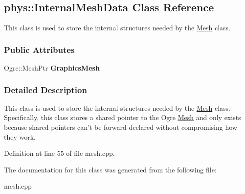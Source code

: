 \hypertarget{classphys_1_1InternalMeshData}{
\subsection{phys::InternalMeshData Class Reference}
\label{classphys_1_1InternalMeshData}
}


This class is used to store the internal structures needed by the \hyperlink{classphys_1_1Mesh}{Mesh} class.  


\subsubsection*{Public Attributes}
\begin{DoxyCompactItemize}
\item 
\hypertarget{classphys_1_1InternalMeshData_a957e499633ab23d7362e89c60f54afbe}{
Ogre::MeshPtr {\bfseries GraphicsMesh}}
\label{classphys_1_1InternalMeshData_a957e499633ab23d7362e89c60f54afbe}

\end{DoxyCompactItemize}


\subsubsection{Detailed Description}
This class is used to store the internal structures needed by the \hyperlink{classphys_1_1Mesh}{Mesh} class. Specifically, this class stores a shared pointer to the Ogre \hyperlink{classphys_1_1Mesh}{Mesh} and only exists because shared pointers can't be forward declared without compromising how they work. 

Definition at line 55 of file mesh.cpp.



The documentation for this class was generated from the following file:\begin{DoxyCompactItemize}
\item 
mesh.cpp\end{DoxyCompactItemize}
